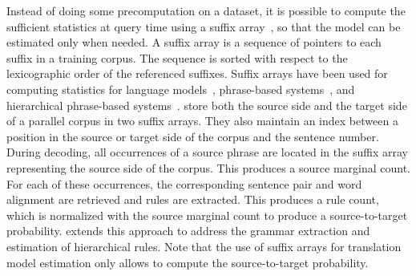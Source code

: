 

Instead of doing some precomputation on a dataset, it is possible to compute
the sufficient
statistics at query time using a suffix array~\citep{manber-myers:1990:SIAM}, so
that the model can be estimated only when needed. A suffix array is a sequence of
pointers to each suffix in a training corpus. The sequence is sorted with
respect to the lexicographic order of the referenced suffixes. Suffix arrays
have been used for computing statistics for language
models~\citep{zhang-vogel:2006:techreport}, phrase-based
systems~\citep{callisonburch-bannard-schroeder:2005:ACL,zhang-vogel:2005:EAMT},
and hierarchical phrase-based systems~\citep{lopez:2007:EMNLP-CoNLL}.
\citet{callisonburch-bannard-schroeder:2005:ACL} store both the source side
and the target side of a parallel corpus in two suffix arrays. They also maintain
an index between a position in the source or target side of the corpus and the
sentence number. During decoding, all occurrences of a source phrase
are located in the suffix array representing the source side of the corpus.
This produces a source marginal count. For each of these occurrences, the corresponding
sentence pair and word alignment are retrieved and rules are extracted. This produces
a rule count, which is normalized with the source marginal count to produce a
source-to-target probability. \citet{lopez:2007:EMNLP-CoNLL} extends this approach
to address the grammar extraction and estimation of hierarchical rules.
Note that the use of suffix arrays for translation model estimation only
allows to compute the source-to-target probability.



